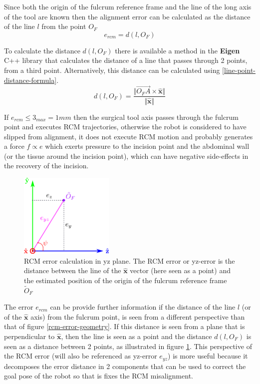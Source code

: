 Since both the origin of the fulcrum reference frame and the line of the long axis of the tool are known then the alignment error can be calculated as the distance of the line $l$ from the point $O_F$
\begin{equation}
e_{rcm} = d(l, O_F)
\end{equation}

To calculate the distance $d(l, O_F)$ there is available a method in the \textbf{Eigen} C++ library that calculates the distance of a line that passes through 2 points, from a third point. Alternatively, this distance 
can be calculated using \ref{line-point-distance-formula}.
\begin{equation}
\label{line-point-distance-formula}
d(l, O_F) = \frac{\Vert \overrightarrow{O_FA} \times \mathbf{\hat{x}} \Vert}{\Vert \mathbf{\hat{x}} \Vert}
\end{equation}

If $e_{rcm} \leq 3_{max} = 1mm$ then the surgical tool axis passes through the fulcrum point and executes RCM trajectories, otherwise the robot is considered to have slipped from alignment, it does not execute RCM motion and 
probably generates a force $f \propto e$ which exerts pressure to the incision point and the abdominal wall (or the tissue around the incision point), which can have negative side-effects in the recovery of the incision.\\

\begin{center}
\begin{figure}[!htb]
\centering
\includegraphics[width=0.4\textwidth]{images/rcm-error-yz.png}
\caption{RCM error calculation in yz plane. The RCM error or yz-error is the distance between the line of the $\mathbf{\hat{x}}$ vector (here seen as a point) and the estimated position of the origin of the
fulcrum reference frame $\tilde{O}_F$}
\label{rcm-error-yz-plane}
\end{figure}
\end{center}

The error $e_{rcm}$ can be provide further information if the distance of the line $l$ (or of the $\mathbf{\hat{x}}$ axis) from the fulcrum point, is seen from a different perspective than that of 
figure \ref{rcm-error-geometry}. If this distance is seen from a plane that is perpendicular to $\mathbf{\hat{x}}$, then the line is seen as a point and the distance $d(l, O_F)$ is seen as a distance between 2 points, 
as illustrated in figure \ref{rcm-error-yz-plane}. This perspective of the RCM error (will also be referenced as yz-error $e_{yz}$) is more useful because it decomposes the error distance in 2 components that can be used to 
correct the goal pose of the robot so that is fixes the RCM misalignment.

